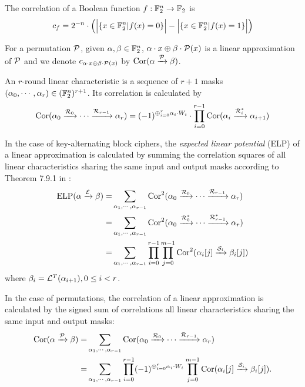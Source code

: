 \begin{definition}[Correlation]
    The correlation of a Boolean function $f:\mathbb{F}_2^n\rightarrow\mathbb{F}_2$ is
    \begin{align*}
        c_f=2^{-n}\cdot\Big(\Big| \{x\in\mathbb{F}_2^n|f(x)=0\} \Big|-\Big| \{x\in\mathbb{F}_2^n|f(x)=1\} \Big|\Big)
    \end{align*}
\end{definition}

\begin{definition}
    For a permutation $\mathcal{P}$, given $\alpha,\beta\in \mathbb{F}_2^n$, $\alpha\cdot x\oplus \beta\cdot\mathcal{P}(x)$ is a linear approximation of $\mathcal{P}$ and we denote $c_{\alpha\cdot x\oplus \beta\cdot\mathcal{P}(x)}$ by $\text{Cor}(\alpha\xrightarrow{\mathcal{P}}\beta)$.
\end{definition}

\begin{definition}
    An $r$-round linear characteristic is a sequence of $r+1$ masks $(\alpha_0,\cdots,\alpha_r)\in(\mathbb{F}_2^n)^{r+1}$. Its correlation is calculated by
    \begin{align*}
        \text{Cor}(\alpha_0\xrightarrow{\mathcal{R}_0}\cdots\xrightarrow{\mathcal{R}_{r-1}}\alpha_r)
        =(-1)^{\oplus_{i=0}^r \alpha_i\cdot W_i}\cdot\prod\limits_{i=0}^{r-1}\text{Cor}(\alpha_i\xrightarrow{\mathcal{R}_i^*}\alpha_{i+1})
    \end{align*}
\end{definition}

In the case of key-alternating block ciphers, the \textit{expected linear potential} (ELP) of a linear approximation is calculated by summing the correlation squares of all linear characteristics sharing the same input and output masks according to Theorem 7.9.1 in \cite{daemen2002design}:
\begin{align*}
    \text{ELP}(\alpha\xrightarrow{\mathcal{E}}\beta)=&\sum\limits_{\alpha_1,\cdots,\alpha_{r-1}}\text{Cor}^2(\alpha_0\xrightarrow{\mathcal{R}_0}\cdots\xrightarrow{\mathcal{R}_{r-1}}\alpha_r)\\
    =&\sum\limits_{\alpha_1,\cdots,\alpha_{r-1}}\text{Cor}^2(\alpha_0\xrightarrow{\mathcal{R}_0^*}\cdots\xrightarrow{\mathcal{R}_{r-1}^*}\alpha_r)\\
    =&\sum\limits_{\alpha_1,\cdots,\alpha_{r-1}}\prod\limits_{i=0}^{r-1}\prod\limits_{j=0}^{m-1}\text{Cor}^2(\alpha_i[j]\xrightarrow{\mathcal{S}_i}\beta_i[j])
\end{align*}
where $\beta_i=\mathcal{L}^T(\alpha_{i+1}),0\leq i<r$.

In the case of permutations, the correlation of a linear approximation is calculated by the signed sum of correlations all linear characteristics sharing the same input and output masks:
\begin{align*}
    \text{Cor}(\alpha\xrightarrow{\mathcal{P}}\beta)=&\sum\limits_{\alpha_1,\cdots,\alpha_{r-1}}\text{Cor}(\alpha_0\xrightarrow{\mathcal{R}_0}\cdots\xrightarrow{\mathcal{R}_{r-1}}\alpha_r)\\
    =&\sum\limits_{\alpha_1,\cdots,\alpha_{r-1}}\prod\limits_{i=0}^{r-1} (-1)^{\oplus_{i=0}^r \alpha_i\cdot W_i} \prod\limits_{j=0}^{m-1}\text{Cor}(\alpha_i[j]\xrightarrow{\mathcal{S}_i}\beta_i[j]).
\end{align*}

